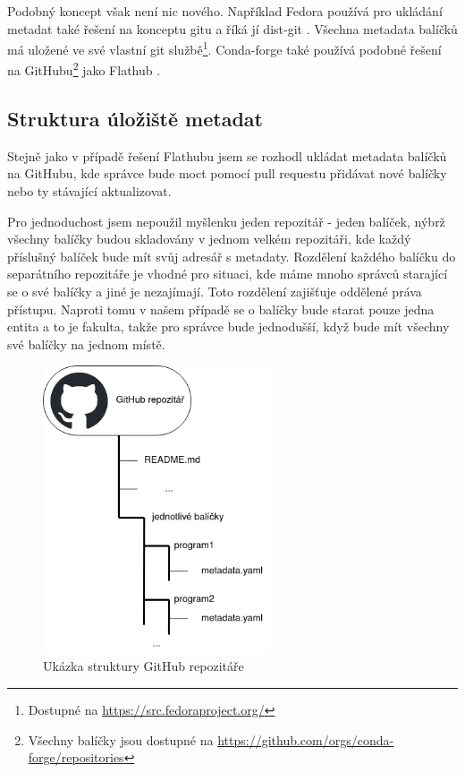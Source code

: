 \documentclass[
  digital,     %
  oneside,     %
  nosansbold,  %
  nocolorbold, %
  lof,         %
  lot,         %
]{fithesis4}
\begin{document}
Podobný koncept však není nic nového. Například Fedora používá pro
ukládání metadat také řešení na konceptu gitu a říká jí 
dist-git \cite{dist-git}. Všechna metadata balíčků má uložené ve
své vlastní git službě\footnote{Dostupné na 
\url{https://src.fedoraproject.org/}}. Conda-forge také používá
podobné řešení na GitHubu\footnote{Všechny balíčky jsou dostupné
na \url{https://github.com/orgs/conda-forge/repositories}} jako
Flathub \cite{conda-forge_repo_creation}.


\subsection{Struktura úložiště metadat}
\label{item:2.3.1}

Stejně jako v případě řešení Flathubu jsem se rozhodl ukládat metadata
balíčků na GitHubu, kde správce bude moct pomocí pull requestu přidávat
nové balíčky nebo ty stávající aktualizovat.

Pro jednoduchost jsem nepoužil myšlenku jeden repozitář - jeden balíček,
nýbrž všechny balíčky budou skladovány v jednom velkém repozitáři, kde
každý příslušný balíček bude mít svůj adresář s metadaty. Rozdělení 
každého balíčku do separátního repozitáře je vhodné pro situaci, kde
máme mnoho správců starající se o své balíčky a jiné je nezajímají.
Toto rozdělení zajišťuje oddělené práva přístupu. Naproti tomu v
našem případě se o balíčky bude starat pouze jedna entita a to je
fakulta, takže pro správce bude jednodušší, když bude mít všechny
své balíčky na jednom místě.

\begin{figure}[H]
  \begin{center}
    \includegraphics[width=0.6\textwidth]{images/png/repository_structure.png}
  \end{center}
  \caption{Ukázka struktury GitHub repozitáře}
  \label{fig:repository_structure}
\end{figure}
\end{document}

